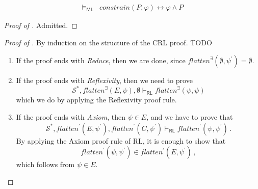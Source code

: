 \documentclass{article}
\newcommand{\RL}{\mathsf{RL}}
\newcommand{\ML}{\mathsf{ML}}
\begin{document}
\begin{lemma}\label{lem:constrainAsConjunction}
    \begin{align*}
        \vDash_{\ML} & \mathit{constrain}(P, \varphi) \leftrightarrow \varphi \land P
    \end{align*}
\end{lemma}
\begin{proof}[Proof of ]
Admitted.
\end{proof}


\begin{proof}[Proof of ]
By induction on the structure of the CRL proof. TODO
\begin{enumerate}
    \item If the proof ends with \emph{Reduce}, then we are done, since $\mathit{flatten}^\exists(\emptyset, \psi^\prime) = \emptyset$.
    
    \item If the proof ends with \emph{Reflexivity}, then we need to prove
    \begin{equation*}
        \mathcal{S}^*, \mathit{flatten}^\exists(E, \psi), \emptyset \vdash_\RL
          \mathit{flatten}^\exists(\psi, \psi) 
    \end{equation*}
    which we do by applying the Reflexivity proof rule.
    
    \item If the proof ends with \emph{Axiom}, then $\psi \in E$,
          and we have to prove that
          \begin{equation*}
            \mathcal{S}^*, \mathit{flatten}^\prime(E, \psi^\prime), \mathit{flatten}^\prime(C, \psi^\prime) \vdash_\RL
            \mathit{flatten}^\prime(\psi, \psi^\prime)               \, .
          \end{equation*}
          By applying the Axiom proof rule of RL, it is enough to show that
          \begin{equation*}
              \mathit{flatten}^\prime(\psi, \psi^\prime) \in \mathit{flatten^\prime}(E, \psi^\prime) \, ,
          \end{equation*}
          which follows from $\psi \in E$.
          

\end{enumerate}
\end{proof}
\end{document}
